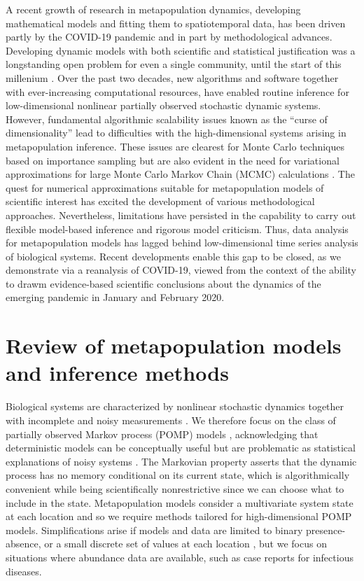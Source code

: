 \documentclass[12pt]{article}\usepackage[]{graphicx}\usepackage[]{xcolor}
\begin{document}
A recent growth of research in metapopulation dynamics, developing mathematical models and fitting them to spatiotemporal data, has been driven partly by the COVID-19 pandemic \cite{li20,wu20,wang22,prieto22,cascante-vega22,pizzuti20,alleman21,yang21,engebretsen23} and in part by methodological advances.
Developing dynamic models with both scientific and statistical justification was a longstanding open problem for even a single community, until the start of this millenium \cite{bjornstad01}.
Over the past two decades, new algorithms \cite{ionides06,toni09,andrieu10,ionides15} and software \cite{king16,kristensen16,devalpine17} together with ever-increasing computational resources, have enabled routine inference for low-dimensional nonlinear partially observed stochastic dynamic systems.
However, fundamental algorithmic scalability issues known as the ``curse of dimensionality'' lead to difficulties with the high-dimensional systems arising in metapopulation inference.
These issues are clearest for Monte Carlo techniques based on importance sampling \cite{bengtsson08} but are also evident in the need for variational approximations for large Monte Carlo Markov Chain (MCMC) calculations \cite{blei17}. 
The quest for numerical approximations suitable for metapopulation models of scientific interest has excited the development of various methodological approaches.
Nevertheless, limitations have persisted in the capability to carry out flexible model-based inference and rigorous model criticism.
Thus, data analysis for metapopulation models has lagged behind low-dimensional time series analysis of biological systems.
Recent developments enable this gap to be closed, as we demonstrate via a reanalysis of COVID-19, viewed from the context of the ability to drawm evidence-based scientific conclusions about the dynamics of the emerging pandemic in January and February 2020.

\section{Review of metapopulation models and inference methods}
\label{sec:review}

Biological systems are characterized by nonlinear stochastic dynamics together with incomplete and noisy measurements  \cite{bjornstad01}.
We therefore focus on the class of partially observed Markov process (POMP) models \cite{breto09}, acknowledging that deterministic models can be conceptually useful but are problematic as statistical explanations of noisy systems \cite{king15,wheeler23}.
The Markovian property asserts that the dynamic process has no memory conditional on its current state, which is algorithmically convenient while being scientifically nonrestrictive since we can choose what to include in the state.
Metapopulation models consider a multivariate system state at each location and so we require methods tailored for high-dimensional POMP models.
Simplifications arise if models and data are limited to binary presence-absence, or a small discrete set of values at each location \cite{mackenzie09}, but we focus on situations where abundance data are available, such as case reports for infectious diseases.
\end{document}
